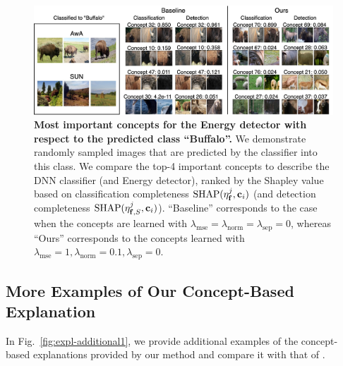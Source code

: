 \begin{figure}[hbt]
\centering
\includegraphics[width=\textwidth]{figures/expl_buffalo.jpeg}
\caption{\textbf{Most important concepts for the Energy detector with respect to the predicted class ``Buffalo''.} 
We demonstrate randomly sampled images that are predicted by the classifier into this class. 
We compare the top-4 important concepts to describe the DNN classifier (and Energy detector), ranked by the Shapley value based on classification completeness $\textrm{SHAP}(\eta^{j}_{\mathbf{f}}, \mathbf{c}_i)$ (and detection completeness $\textrm{SHAP}(\eta^{j}_{\mathbf{f}, S}, \mathbf{c}_i)$).
``Baseline'' corresponds to the case when the concepts are learned with $\lambda_\textrm{mse} = \lambda_\textrm{norm} = \lambda_\textrm{sep} = 0$, whereas ``Ours'' corresponds to the concepts learned with $\lambda_\textrm{mse} = 1, \lambda_\textrm{norm} = 0.1, \lambda_\textrm{sep} = 0$.
}
\label{fig:shap_buffalo}
\end{figure}

\subsection{More Examples of Our Concept-Based Explanation}
\label{app:more-expl}
In Fig.~\ref{fig:expl-additional1}, we provide additional examples of the concept-based explanations provided by  our method and compare it with that of \cite{yeh2020completeness}.




